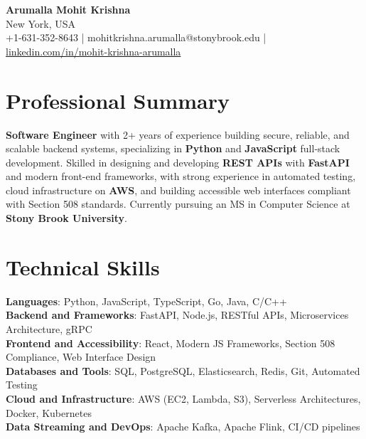 \documentclass[letterpaper,11pt]{article}
\begin{document}
\begin{center}
  {\Large \textbf{Arumalla Mohit Krishna}} \\
  New York, USA \\
  +1-631-352-8643 \enspace | \enspace mohitkrishna.arumalla@stonybrook.edu \enspace | \enspace \href{https://www.linkedin.com/in/mohit-krishna-arumalla}{linkedin.com/in/mohit-krishna-arumalla}
\end{center}

\section{Professional Summary}
  \begin{itemize}[leftmargin=0.15in, label={}]
    \small{\item{
     \textbf{Software Engineer} with 2+ years of experience building secure, reliable, and scalable backend systems, specializing in \textbf{Python} and \textbf{JavaScript} full-stack development. Skilled in designing and developing \textbf{REST APIs} with \textbf{FastAPI} and modern front-end frameworks, with strong experience in automated testing, cloud infrastructure on \textbf{AWS}, and building accessible web interfaces compliant with Section 508 standards. Currently pursuing an MS in Computer Science at \textbf{Stony Brook University}.
    }}
  \end{itemize}
\vspace{-16pt}

\section{Technical Skills}
 \begin{itemize}[leftmargin=0.15in, label={}]
    \small{\item{
     \textbf{Languages}: Python, JavaScript, TypeScript, Go, Java, C/C++ \\
     \textbf{Backend and Frameworks}: FastAPI, Node.js, RESTful APIs, Microservices Architecture, gRPC \\
     \textbf{Frontend and Accessibility}: React, Modern JS Frameworks, Section 508 Compliance, Web Interface Design \\
     \textbf{Databases and Tools}: SQL, PostgreSQL, Elasticsearch, Redis, Git, Automated Testing \\
     \textbf{Cloud and Infrastructure}: AWS (EC2, Lambda, S3), Serverless Architectures, Docker, Kubernetes \\
     \textbf{Data Streaming and DevOps}: Apache Kafka, Apache Flink, CI/CD pipelines
    }}
 \end{itemize}
\vspace{-16pt}
\end{document}
